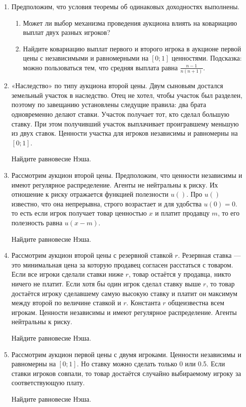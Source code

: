 

\begin{enumerate}
\item Предположим, что условия теоремы об одинаковых доходностях выполнены.
\begin{enumerate}
\item Может ли выбор механизма проведения аукциона влиять на ковариацию выплат двух разных игроков?
\item  Найдите ковариацию выплат первого и второго игрока в аукционе первой цены с независимыми и равномерными на $ [0;1] $ ценностями. Подсказка: можно пользоваться тем, что средняя выплата равна $ \frac{n-1}{n(n+1)} $.
\end{enumerate}


\item «Наследство» по типу аукциона второй цены. Двум сыновьям достался земельный участок в наследство. Отец не хотел, чтобы участок был разделен, поэтому по завещанию установлены следущие правила: два брата одновременно делают ставки. Участок получает тот, кто сделал большую ставку. При этом получивший участок выплачивает проигравшему меньшую из двух ставок. Ценности участка для игроков независимы и равномерны на $ [0;1] $.

Найдите равновесие Нэша.


\item Рассмотрим аукцион второй цены. Предположим, что ценности независимы и имеют регулярное распределение. Агенты не нейтральны к риску. Их отношение к риску отражается функцией полезности $ u() $. Про $ u() $ известно, что она непрерывна, строго возрастает и для удобства $ u(0)=0 $. то есть если игрок получает товар ценностью $ x $ и платит продавцу $ m $, то его полезность равна $ u(x-m) $.

Найдите равновесие Нэша.



\item Рассмотрим аукцион второй цены с резервной ставкой $ r $. Резервная ставка — это минимальная цена за которую продавец согласен расстаться с товаром. Если все игроки сделали ставки ниже $ r $, товар остаётся у продавца, никто ничего не платит. Если хотя бы один игрок сделал ставку выше $ r $, то товар достаётся игроку сделавшему самую высокую ставку и платит он максимум между второй по величине ставкой и $ r $. Константа $ r $ общеизвестна всем игрокам. Ценности независимы и имеют регулярное распределение. Агенты нейтральны к риску.

Найдите равновесие Нэша.


\item Рассмотрим аукцион первой цены с двумя игроками. Ценности независимы и равномерны на $ [0;1] $. Но ставку можно сделать только 0 или 0.5. Если ставки игроков совпали, то товар достаётся случайно выбираемому игроку за соответствующую плату.

Найдите равновесие Нэша.

\end{enumerate}
